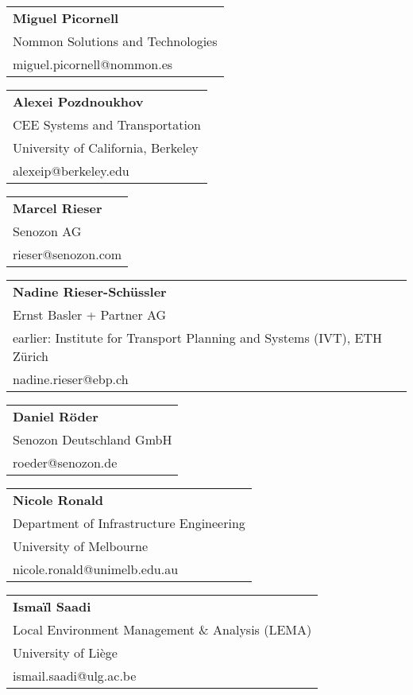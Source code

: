 \begin{tabular}[width=0.48\textwidth]{@{}l}
\textbf{Miguel Picornell} \\
Nommon Solutions and Technologies \\
miguel.picornell@nommon.es \\
\end{tabular}

\begin{tabular}[width=0.48\textwidth]{@{}l}
\textbf{Alexei Pozdnoukhov} \\
CEE Systems and Transportation \\
University of California, Berkeley \\
alexeip@berkeley.edu \\
\end{tabular}

\begin{tabular}[width=0.48\textwidth]{@{}l}
\textbf{Marcel Rieser} \\
Senozon AG \\
rieser@senozon.com \\
\end{tabular}

\begin{tabular}[width=0.48\textwidth]{@{}l}
\textbf{Nadine Rieser-Schüssler} \\
Ernst Basler + Partner AG \\
earlier: Institute for Transport Planning and Systems (IVT), ETH Zürich \\
nadine.rieser@ebp.ch \\
\end{tabular}

\begin{tabular}[width=0.48\textwidth]{@{}l}
\textbf{Daniel Röder} \\
Senozon Deutschland GmbH \\
roeder@senozon.de \\
\end{tabular}

\begin{tabular}[width=0.48\textwidth]{@{}l}
\textbf{Nicole Ronald} \\
Department of Infrastructure Engineering \\
University of Melbourne \\
nicole.ronald@unimelb.edu.au \\
\end{tabular}

\begin{tabular}[width=0.48\textwidth]{@{}l}
\textbf{Ismaïl Saadi} \\
Local Environment Management \& Analysis (LEMA) \\
University of Liège \\
ismail.saadi@ulg.ac.be \\
\end{tabular}

